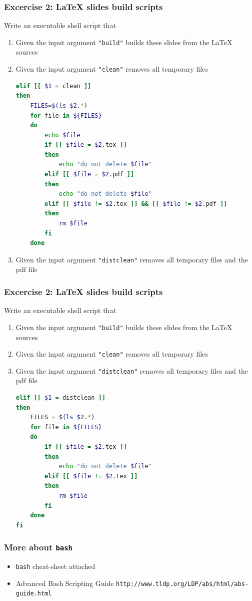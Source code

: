 \documentclass[10pt,c,ignorenonframetext]{beamer}
\begin{document}
\begin{frame}[fragile]
\frametitle{Excercise 2: LaTeX slides build scripts}
Write an executable shell script that
\begin{enumerate}
\item Given the input argument {\tt "build"} builds these slides from the LaTeX sources
\item Given the input argument {\tt "clean"} removes all temporary files
{\tiny
\begin{lstlisting}[language=bash]
elif [[ $1 = clean ]]
then
    FILES=$(ls $2.*)   
    for file in ${FILES}
    do
        echo $file
        if [[ $file = $2.tex ]]
        then
            echo "do not delete $file"
        elif [[ $file = $2.pdf ]]
        then
            echo "do not delete $file"
        elif [[ $file != $2.tex ]] && [[ $file != $2.pdf ]]
        then
            rm $file
        fi        
    done
\end{lstlisting}
}
\item Given the input argument {\tt "distclean"} removes all temporary files and the pdf file
\end{enumerate}
\end{frame}

\begin{frame}[fragile]
\frametitle{Excercise 2: LaTeX slides build scripts}
Write an executable shell script that
\begin{enumerate}
\item Given the input argument {\tt "build"} builds these slides from the LaTeX sources
\item Given the input argument {\tt "clean"} removes all temporary files
\item Given the input argument {\tt "distclean"} removes all temporary files and the pdf file
{\tiny
\begin{lstlisting}[language=bash]
elif [[ $1 = distclean ]]
then
    FILES = $(ls $2.*)
    for file in ${FILES}
    do
        if [[ $file = $2.tex ]]
        then
            echo "do not delete $file"
        elif [[ $file != $2.tex ]]
        then
            rm $file
        fi        
    done
fi
\end{lstlisting}
}
\end{enumerate}
\end{frame}

\begin{frame}
\frametitle{More about {\tt bash}}

\begin{itemize}
\item {\tt bash} cheat-sheet attached
\item Advanced Bash Scripting Guide {\tt http://www.tldp.org/LDP/abs/html/abs-guide.html}
\end{itemize}

\end{frame}
\end{document}
